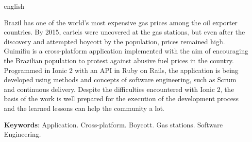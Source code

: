 \begin{resumo}[Abstract]
 \begin{otherlanguage*}{english}

     Brazil has one of the world's most expensive gas prices among the oil exporter countries. By 2015, cartels were uncovered at the gas stations, but even after the discovery and attempted boycott by the population, prices remained high. Guimifiu is a cross-platform application implemented with the aim of encouraging the Brazilian population to protest against abusive fuel prices in the country. Programmed in Ionic 2 with an API in Ruby on Rails, the application is being developed using methods and concepts of software engineering, such as Scrum and continuous delivery. Despite the difficulties encountered with Ionic 2, the basis of the work is well prepared for the execution of the development process and the learned lessons can help the community a lot.

     \vspace{\onelineskip}
        
     \noindent
     \textbf{Keywords}: Application. Cross-platform. Boycott. Gas stations. Software Engineering. 
 \end{otherlanguage*}
\end{resumo}
